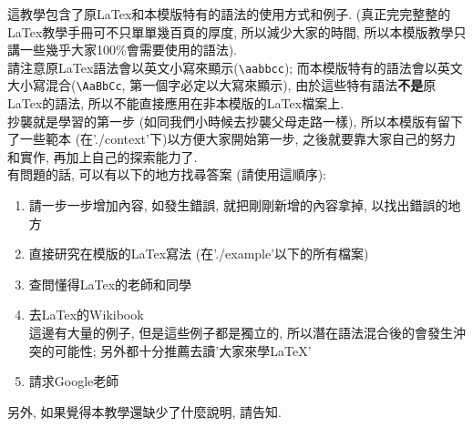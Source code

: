 

這教學包含了原LaTex和本模版特有的語法的使用方式和例子. (真正完完整整的LaTex教學手冊可不只單單幾百頁的厚度, 所以減少大家的時間, 所以本模版教學只講一些幾乎大家100\%會需要使用的語法).\\

請注意原LaTex語法會以英文小寫來顯示(\verb|\aabbcc|); 而本模版特有的語法會以英文大小寫混合(\verb|\AaBbCc|, 第一個字必定以大寫來顯示), 由於這些特有語法\textbf{不是}原LaTex的語法, 所以不能直接應用在非本模版的LaTex檔案上.\\

抄襲就是學習的第一步 (如同我們小時候去抄襲父母走路一樣), 所以本模版有留下了一些範本 (在'./context'下)以方便大家開始第一步, 之後就要靠大家自己的努力和實作, 再加上自己的探索能力了.\\

有問題的話, 可以有以下的地方找尋答案 (請使用這順序):
\begin{enumerate}
  \item 請一步一步增加內容, 如發生錯誤, 就把剛剛新增的內容拿掉, 以找出錯誤的地方
  \item 直接研究在模版的LaTex寫法 (在'./example'以下的所有檔案)
  \item 查問懂得LaTex的老師和同學
  \item 去LaTex的Wikibook\\
        這邊有大量的例子, 但是這些例子都是獨立的, 所以潛在語法混合後的會發生沖突的可能性; 另外都十分推薦去讀'大家來學LaTeX' 
  \item 請求Google老師
\end{enumerate}

另外, 如果覺得本教學還缺少了什麼說明, 請告知.


\newpage
\newpage
\newpage
\newpage
\newpage
\newpage
\newpage
\newpage

\EndChapter
